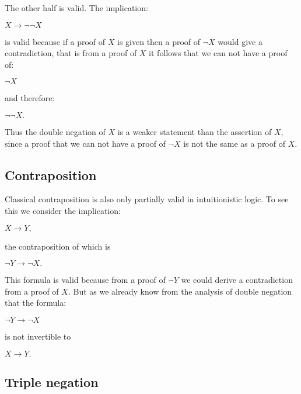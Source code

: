 \documentclass[12pt]{article}
\begin{document}
The other half is valid. The implication:

\begin{center}
$X \rightarrow \neg \neg X$
\end{center}

is valid because if a proof of $X$ is given then a proof of $\neg X$ would give a contradiction, that is from a proof of $X$ it follows that we can not have a proof of:

\begin{center}
$\neg X$
\end{center}

and therefore:          

\begin{center}
$\neg \neg X.$
\end{center}

Thus the double negation of $X$ is a weaker statement than the assertion of $X$, since a proof that we can not have a proof of $\neg X$ is not the same as a proof of $X.$

\subsection{Contraposition}

Classical contraposition is also only partially valid in intuitionistic logic. To see this we consider the implication:

\begin{center}
$X \rightarrow Y,$ 
\end{center}

the contraposition of which is

\begin{center}
$\neg Y \rightarrow \neg X.$
\end{center}

This formula is valid because from a proof of $\neg Y$ we could derive a contradiction from a proof of $X$. But as we already know from the analysis of double negation that the formula:

\begin{center}
$\neg Y \rightarrow \neg X$
\end{center}

is not invertible to                            

\begin{center}
$X \rightarrow Y.$
\end{center}

\subsection{Triple negation}
\end{document}
